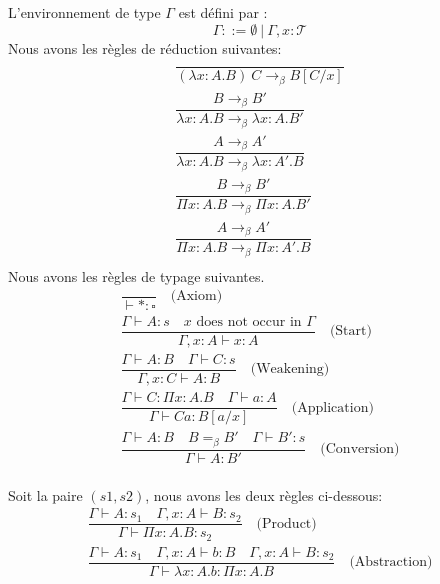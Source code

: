 \documentclass[11pt]{book}
\begin{document}
L'environnement de type $\Gamma$ est défini par :
$$ \Gamma ::= \emptyset\ |\  \Gamma, x:\mathcal{T} $$
Nous avons les règles de réduction suivantes:
$$
\begin{array}{l}
 \dfrac {}{(\lambda x:A.B)~C\to _{\beta }B[C/x]} \\[1cm]
 

\dfrac {B\to _{\beta }B'}{\lambda x:A.B\to _{\beta }\lambda x:A.B'} \\[1cm]


\dfrac {A\to _{\beta }A'}{\lambda x:A.B\to _{\beta }\lambda x:A'.B} \\[1cm]


\dfrac {B\to _{\beta }B'}{\Pi x:A.B\to _{\beta }\Pi x:A.B'} \\[1cm]


\dfrac {A\to _{\beta }A'}{\Pi x:A.B\to _{\beta }\Pi x:A'.B} \\[1cm]
  
\end{array}
$$
Nous avons les règles de typage suivantes.
\[
\begin{array}{l}

\dfrac {}{\vdash *:\square }\quad {\text{(Axiom)}}\\[1cm]

\dfrac {\Gamma \vdash A:s\quad x{\text{ does not occur in }}\Gamma }{\Gamma ,x:A\vdash x:A}\quad {\text{(Start)}}\\[1cm]

\dfrac {\Gamma \vdash A:B\quad \Gamma \vdash C:s}{\Gamma ,x:C\vdash A:B}\quad {\text{(Weakening)}}\\[1cm]

\dfrac {\Gamma \vdash C:\Pi x:A.B\quad \Gamma \vdash a:A}{\Gamma \vdash Ca:B[a/x]}\quad {\text{(Application)}}\\[1cm]

\dfrac {\Gamma \vdash A:B\quad B=_{\beta }B'\quad \Gamma \vdash B':s}{\Gamma \vdash A:B'}\quad {\text{(Conversion)}}\\[1cm]
\end{array}
\]

Soit la paire $( s 1 , s 2 ) $, nous avons les deux règles ci-dessous:
$$
\begin{array}{l}

\dfrac {\Gamma \vdash A:s_{1}\quad \Gamma ,x:A\vdash B:s_{2}}{\Gamma \vdash \Pi x:A.B:s_{2}}\quad {\text{(Product)}} \\[1cm]

\dfrac {\Gamma \vdash A:s_{1}\quad \Gamma ,x:A\vdash b:B\quad \Gamma ,x:A\vdash B:s_{2}}{\Gamma \vdash \lambda x:A.b:\Pi x:A.B}\quad {\text{(Abstraction)}}
\end{array}
$$
\end{document}
